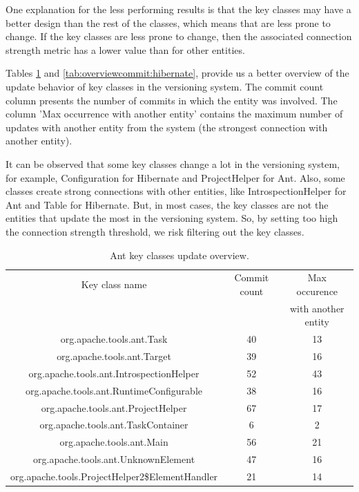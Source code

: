 \documentclass[runningheads]{comsis2}
\begin{document}
One explanation for the less performing results is that the key classes may have a better design than the rest of the classes, which means that are less prone to change. If the key classes are less prone to change, then the associated connection strength metric has a lower value than for other entities.

Tables \ref{tab:overviewcommit:ant} and \ref{tab:overviewcommit:hibernate}, provide us a better overview of the update behavior of key classes in the versioning system. The commit count column presents the number of commits in which the entity was involved. The column 'Max occurrence with another entity' contains the maximum number of updates with another entity from the system (the strongest connection with another entity).

It can be observed that some key classes change a lot in the versioning system, for example, Configuration for Hibernate and ProjectHelper for Ant. Also, some classes create strong connections with other entities, like IntrospectionHelper for Ant and Table for Hibernate. But, in most cases, the key classes are not the entities that update the most in the versioning system.
So, by setting too high the connection strength threshold, we risk filtering out the key classes.



\begin{table}[!h]
\setlength\tabcolsep{3.5pt}
\caption{ Ant key classes update overview.}
\label{tab:overviewcommit:ant}
\centering
\begin{tabular}{|c|c|c|}
\hline
Key class name &	Commit count	&	Max occurence 	 \\
&		&	with another entity	 \\
\hline

org.apache.tools.ant.Task	&	40	&	13	\\
org.apache.tools.ant.Target	&	39	&	16	\\
org.apache.tools.ant.IntrospectionHelper	&	52	&	43	\\
org.apache.tools.ant.RuntimeConfigurable	&	38	&	16	\\
org.apache.tools.ant.ProjectHelper	&	67	&	17	\\
org.apache.tools.ant.TaskContainer	&	6	&	2	\\
org.apache.tools.ant.Main	&	56	&	21	\\
org.apache.tools.ant.UnknownElement	&	47	&	16	\\
org.apache.tools.ProjectHelper2\$ElementHandler	&	21	&	14	\\

\hline
\end{tabular}
\end{table}
\end{document}
